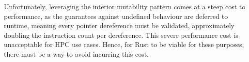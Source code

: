 

Unfortunately, leveraging the interior mutability pattern comes at a steep cost to performance, as the guarantees against undefined behaviour are deferred to runtime, meaning every pointer dereference must be validated, approximately doubling the instruction count per dereference.
This severe performance cost is unacceptable for \acrshort{HPC} use cases. Hence, for Rust to be viable for these purposes, there must be a way to avoid incurring this cost.

